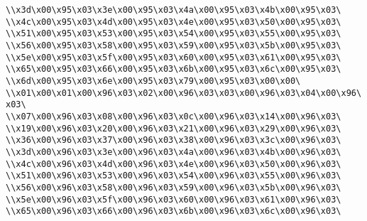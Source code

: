 \verb|\\x3d\x00\x95\x03\x3e\x00\x95\x03\x4a\x00\x95\x03\x4b\x00\x95\x03\|\newline
\verb|\\x4c\x00\x95\x03\x4d\x00\x95\x03\x4e\x00\x95\x03\x50\x00\x95\x03\|\newline
\verb|\\x51\x00\x95\x03\x53\x00\x95\x03\x54\x00\x95\x03\x55\x00\x95\x03\|\newline
\verb|\\x56\x00\x95\x03\x58\x00\x95\x03\x59\x00\x95\x03\x5b\x00\x95\x03\|\newline
\verb|\\x5e\x00\x95\x03\x5f\x00\x95\x03\x60\x00\x95\x03\x61\x00\x95\x03\|\newline
\verb|\\x65\x00\x95\x03\x66\x00\x95\x03\x6b\x00\x95\x03\x6c\x00\x95\x03\|\newline
\verb|\\x6d\x00\x95\x03\x6e\x00\x95\x03\x79\x00\x95\x03\x00\x00\|\newline
\verb|\\x01\x00\x01\x00\x96\x03\x02\x00\x96\x03\x03\x00\x96\x03\x04\x00\x96\x03\|\newline
\verb|\\x07\x00\x96\x03\x08\x00\x96\x03\x0c\x00\x96\x03\x14\x00\x96\x03\|\newline
\verb|\\x19\x00\x96\x03\x20\x00\x96\x03\x21\x00\x96\x03\x29\x00\x96\x03\|\newline
\verb|\\x36\x00\x96\x03\x37\x00\x96\x03\x38\x00\x96\x03\x3c\x00\x96\x03\|\newline
\verb|\\x3d\x00\x96\x03\x3e\x00\x96\x03\x4a\x00\x96\x03\x4b\x00\x96\x03\|\newline
\verb|\\x4c\x00\x96\x03\x4d\x00\x96\x03\x4e\x00\x96\x03\x50\x00\x96\x03\|\newline
\verb|\\x51\x00\x96\x03\x53\x00\x96\x03\x54\x00\x96\x03\x55\x00\x96\x03\|\newline
\verb|\\x56\x00\x96\x03\x58\x00\x96\x03\x59\x00\x96\x03\x5b\x00\x96\x03\|\newline
\verb|\\x5e\x00\x96\x03\x5f\x00\x96\x03\x60\x00\x96\x03\x61\x00\x96\x03\|\newline
\verb|\\x65\x00\x96\x03\x66\x00\x96\x03\x6b\x00\x96\x03\x6c\x00\x96\x03\|\newline
